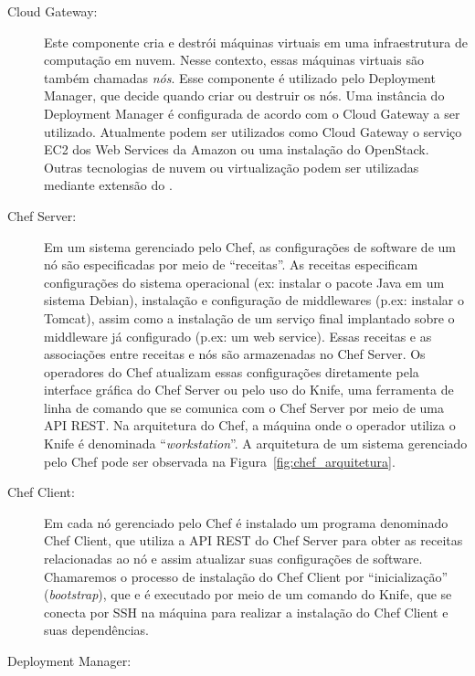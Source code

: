 \begin{description}

\item [Cloud Gateway:]

Este componente cria e destrói máquinas virtuais em uma infraestrutura de computação em nuvem. Nesse contexto, essas máquinas virtuais são também chamadas \emph{nós}. Esse componente é utilizado pelo Deployment Manager, que decide quando criar ou destruir os nós. Uma instância do Deployment Manager é configurada de acordo com o Cloud Gateway a ser utilizado. Atualmente podem ser utilizados como Cloud Gateway o serviço EC2 dos Web Services da Amazon ou uma instalação do OpenStack. Outras tecnologias de nuvem ou virtualização podem ser utilizadas mediante extensão do \dm.

\item [Chef Server:]

Em um sistema gerenciado pelo Chef, as configurações de software de um nó são especificadas por meio de ``receitas''. As receitas especificam configurações do sistema operacional (ex: instalar o pacote Java em um sistema Debian), instalação e configuração de middlewares (p.ex: instalar o Tomcat), assim como a instalação de um serviço final implantado sobre o middleware já configurado (p.ex: um web service). Essas receitas e as associações entre receitas e nós são armazenadas no Chef Server. Os operadores do Chef atualizam essas configurações diretamente pela interface gráfica do Chef Server ou pelo uso do Knife, uma ferramenta de linha de comando que se comunica com o Chef Server por meio de uma API REST. Na arquitetura do Chef, a máquina onde o operador utiliza o Knife é denominada ``\textit{workstation}''. A arquitetura de um sistema gerenciado pelo Chef pode ser observada na Figura~\ref{fig:chef_arquitetura}.

\item [Chef Client:]

Em cada nó gerenciado pelo Chef é instalado um programa denominado Chef Client, que utiliza a API REST do Chef Server para obter as receitas relacionadas ao nó e assim atualizar suas configurações de software. Chamaremos o processo de instalação do Chef Client por ``inicialização'' (\textit{bootstrap}), que e é executado por meio de um comando do Knife, que se conecta por SSH na máquina para realizar a instalação do Chef Client e suas dependências.

\item [Deployment Manager:]


\end{description}
